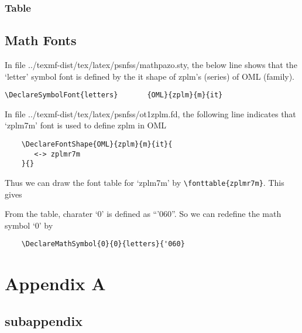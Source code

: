 \documentclass[10pt,a4paper,extrafontsizes,oldfontcommands,oneside]{memoir}
\begin{document}
\subsection{Table} %
\label{sub:table3}

\clearpage
\section{Math Fonts}

In file ../texmf-dist/tex/latex/psnfss/mathpazo.sty, the below line shows that the `letter' symbol font is defined by the it shape of zplm's (series) of OML (family).
\begin{verbatim}
\DeclareSymbolFont{letters}       {OML}{zplm}{m}{it}
\end{verbatim}

In file ../texmf-dist/tex/latex/psnfss/ot1zplm.fd, the following line indicates that `zplm7m' font is used to define zplm in OML
\begin{verbatim}
	\DeclareFontShape{OML}{zplm}{m}{it}{
	   <-> zplmr7m
	}{}
\end{verbatim}

Thus we can draw the font table for `zplm7m' by \verb+\fonttable{zplmr7m}+. This gives

From the table, charater `0' is defined as ``'060''. So we can redefine the math symbol `0' by
\begin{verbatim}
	\DeclareMathSymbol{0}{0}{letters}{'060}
\end{verbatim}

\clearpage

\appendix

\chapter{Appendix A} %
\label{chap:appendix_a}

\section{subappendix} %
\label{sec:subappendix}




\printbibliography
\end{document}
